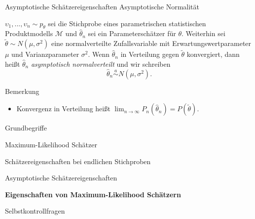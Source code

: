 \documentclass[
  8pt,
  ignorenonframetext,
]{beamer}
\providecommand{\tightlist}{%
  \setlength{\itemsep}{0pt}\setlength{\parskip}{0pt}}
\newcommand{\ups} {\upsilon}
\begin{document}
\begin{frame}{\small Asymptotische Schätzereigenschaften \textbar{}
Asymptotische Normalität}
\protect\hypertarget{asymptotische-schuxe4tzereigenschaften-asymptotische-normalituxe4t}{}
\small
\begin{definition}
\justifying
$\ups_1,...,\ups_n \sim p_\theta$ sei die Stichprobe eines parametrischen statistischen
Produktmodells $\mathcal{M}$ und $\hat{\theta}_n$ sei ein Parameterschätzer für
$\theta$. Weiterhin sei $\tilde{\theta} \sim N(\mu,\sigma^2)$ eine normalverteilte
Zufallsvariable mit Erwartungswertparameter $\mu$ und Varianzparameter $\sigma^2$.
Wenn $\hat{\theta}_n$ in Verteilung gegen $\tilde{\theta}$ konvergiert, dann heißt
$\hat{\theta}_n$ \textit{asymptotisch normalverteilt} und wir schreiben
\begin{equation}
\hat{\theta}_n  \stackrel{a}{\sim}  N(\mu,\sigma^2).
\end{equation}
\end{definition}

\footnotesize

Bemerkung

\begin{itemize}
\tightlist
\item
  Konvergenz in Verteilung heißt
  \(\lim_{n\to \infty} P_n(\hat{\theta}_n) = P(\tilde{\theta})\).
\end{itemize}
\end{frame}

\begin{frame}{}
\protect\hypertarget{section-11}{}
\large
\vfill
{}

Grundbegriffe

Maximum-Likelihood Schätzer

Schätzereigenschaften bei endlichen Stichproben

Asymptotische Schätzereigenschaften

\textbf{Eigenschaften von Maximum-Likelihood Schätzern}

Selbstkontrollfragen \vfill
\end{frame}
\end{document}
